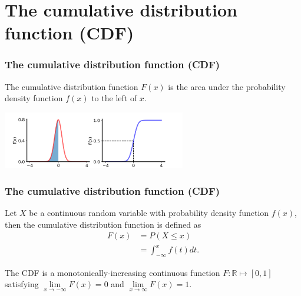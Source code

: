 \documentclass{beamer}
\begin{document}
\section{The cumulative distribution function (CDF)}
\begin{frame}
\frametitle{The cumulative distribution function (CDF)}

The cumulative distribution function $F(x)$ is the area under the probability density function $f(x)$ to the left of $x$.

\center \includegraphics[height=2.5cm]{images/pdf_cdf_0point5.png}

\end{frame}

\begin{frame}
\frametitle{The cumulative distribution function (CDF)}


\vspace{.3cm}

\begin{definition} 
Let $X$ be a continuous random variable with probability density function $f(x)$, then the cumulative distribution function is defined as
\begin{align*}
F(x) &= P(X \leq x)\\
&= \int_{-\infty}^x f(t) dt.
\end{align*} 
\end{definition}

\vspace{0.5cm}

The CDF is a monotonically-increasing continuous function $F: \mathbb{R} \mapsto [0, 1]$ satisfying $\lim\limits_{x \to -\infty} F(x) = 0$ and $\lim\limits_{x \to \infty} F(x) = 1$.

\end{frame}
\end{document}
